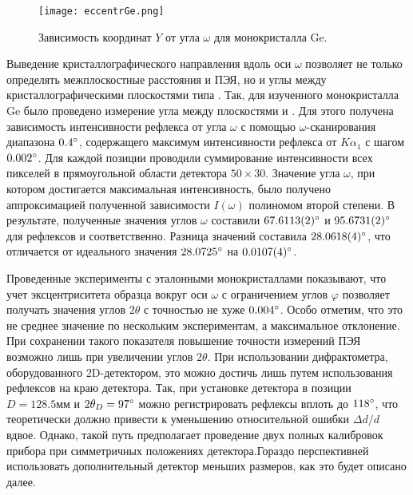 \begin{figure}[ht!]
    \centering
    \texttt{[image: eccentrGe.png]}
    \caption{Зависимость координат $Y$ от угла $\omega$ для монокристалла Ge.}%
    \label{fig:eccentrGe}
\end{figure}

Выведение кристаллографического направления вдоль оси $\omega$ позволяет не только определять межплоскостные расстояния и ПЭЯ, но и углы между кристаллографическими плоскостями типа \hkl[h 0 l].
Так, для изученного монокристалла Ge было проведено измерение угла между плоскостями \hkl[6 0 -10] и \hkl[10 0 -6].
Для этого получена зависимость интенсивности рефлекса от угла $\omega$ с помощью $\omega$-сканирования диапазона $0.4^\circ$, содержащего максимум интенсивности рефлекса от $K\alpha_1$ с шагом $0.002^\circ$.
Для каждой позиции проводили суммирование интенсивности всех пикселей в прямоугольной области детектора $50\times30$.
Значение угла $\omega$, при котором достигается максимальная интенсивность, было получено аппроксимацией полученной зависимости $I(\omega)$ полиномом второй степени.
В результате, полученные значения углов $\omega$ составили $67.6113 (2)^\circ$ и $95.6731 (2)^\circ$ для рефлексов \hkl[6 0 -10] и \hkl[10 0 -6] соответственно.
Разница значений составила $28.0618 (4)^\circ$, что отличается от идеального значения $28.0725^\circ$ на $0.0107 (4)^\circ$.

Проведенные эксперименты с эталонными монокристаллами показывают, что учет эксцентриситета образца вокруг оси $\omega$ с ограничением углов $\varphi$ позволяет получать значения углов $2\theta$ с точностью не хуже $0.004^\circ$.
Особо отметим, что это не среднее значение по нескольким экспериментам, а максимальное отклонение.
При сохранении такого показателя повышение точности измерений ПЭЯ возможно лишь при увеличении углов $2\theta$.
При использовании дифрактометра, оборудованного 2D-детектором, это можно достичь лишь путем использования рефлексов на краю детектора.
Так, при установке детектора в позиции $D = 128.5\unit{мм}$ и $2\theta_D = 97^\circ$ можно регистрировать рефлексы вплоть до $118^\circ$, что теоретически должно привести к уменьшению относительной ошибки $\Delta d / d$ вдвое.
Однако, такой путь предполагает проведение двух полных калибровок прибора при симметричных положениях детектора.Гораздо перспективней использовать дополнительный детектор меньших размеров, как это будет описано далее.

